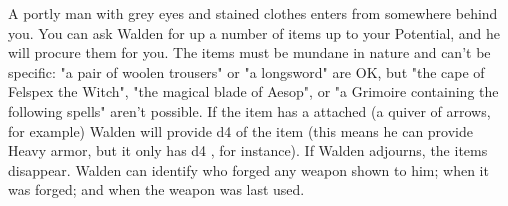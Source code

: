 
A portly man with grey eyes and stained clothes enters from somewhere behind you.  You can ask Walden for up a number of items up to your Potential, and he will procure them for you.  The items must be mundane in nature and can't be specific:  "a pair of woolen trousers" or "a longsword" are OK, but "the cape of Felspex the Witch", "the magical blade of Aesop", or "a Grimoire containing the following spells" aren't possible.  If the item has a \UD attached (a quiver of arrows, for example) Walden will provide d4 \UD of the item (this means he can provide Heavy armor, but it only has d4 \UD, for instance).  If Walden adjourns, the items disappear.  Walden can identify who forged any weapon shown to him; when it was forged; and when the weapon was last used.






